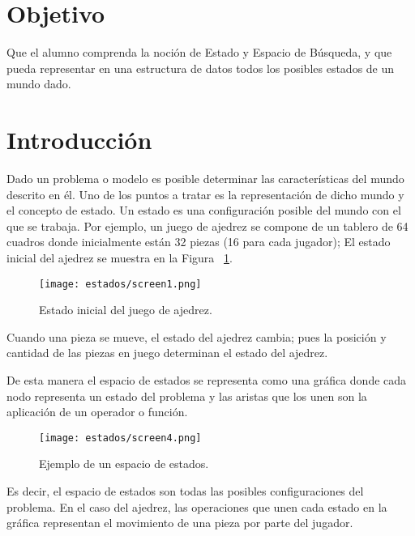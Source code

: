 

\section{Objetivo}
Que el alumno comprenda la noción de Estado y Espacio de Búsqueda, y que pueda representar en una estructura de datos todos los posibles estados de un mundo dado. \par

\section{Introducci\'on}
Dado un problema o modelo es posible determinar las características del mundo descrito en él. Uno de los puntos a tratar es la representación de dicho mundo y el concepto de estado. Un estado es una configuración posible del mundo con el que se trabaja. Por ejemplo, un juego de ajedrez se compone de un tablero de 64 cuadros donde inicialmente están 32 piezas (16 para cada jugador); El estado inicial del ajedrez se muestra en la Figura ~\ref{fig:ajedrez}.\par

\begin{figure}
  \centering
  \texttt{[image: estados/screen1.png]}
  \caption{Estado inicial del juego de ajedrez.}
  \label{fig:ajedrez}
\end{figure}

Cuando una pieza se mueve, el estado del ajedrez cambia; pues la posición y cantidad de las piezas en juego determinan el estado del ajedrez.\par

\noindent De esta manera el espacio de estados se representa como una gráfica donde cada nodo representa un estado del problema y las aristas que los unen son la aplicación de un operador o función.\par


\begin{figure}
  \centering
  \texttt{[image: estados/screen4.png]}
  \caption{Ejemplo de un espacio de estados. \protect\footnotemark }
  \label{fig:espacioestados}
\end{figure}


Es decir, el espacio de estados son todas las posibles configuraciones del problema. En el caso del ajedrez, las operaciones que unen cada estado en la gráfica representan el movimiento de una pieza por parte del jugador.\par


